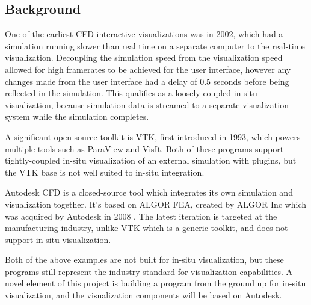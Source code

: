 \subsection{Background}




One of the earliest CFD interactive visualizations was in 2002, which had a simulation running slower than real time on a separate computer to the real-time visualization\cite{paper:2002vis:10.5555/509740.509745}.
Decoupling the simulation speed from the visualization speed allowed for high framerates to be achieved for the user interface, however any changes made from the user interface had a delay of 0.5 seconds before being reflected in the simulation.
This qualifies as a loosely-coupled in-situ visualization, because simulation data is streamed to a separate visualization system while the simulation completes.

A significant open-source toolkit is VTK, first introduced in 1993, which powers multiple tools such as ParaView and VisIt.
Both of these programs support tightly-coupled in-situ visualization of an external simulation with plugins, but the VTK base is not well suited to in-situ integration.

Autodesk CFD is a closed-source tool which integrates its own simulation and visualization together.
It's based on ALGOR FEA, created by ALGOR Inc which was acquired by Autodesk in 2008 .
The latest iteration is targeted at the manufacturing industry, unlike VTK which is a generic toolkit, and does not support in-situ visualization.

Both of the above examples are not built for in-situ visualization, but these programs still represent the industry standard for visualization capabilities.
A novel element of this project is building a program from the ground up for in-situ visualization, and the visualization components will be based on Autodesk.